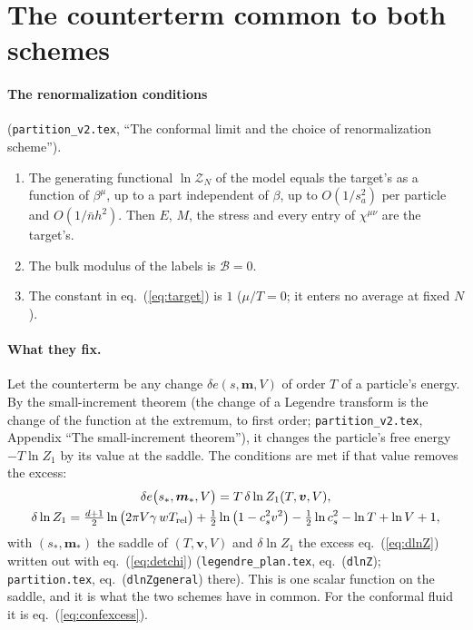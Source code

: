 \documentclass[11pt,aps,preprint,nofootinbib,superscriptaddress,tightenlines]{revtex4-2}
\newcommand{\klab}{\mathcal B}
\def\st{\begin{equation}}
\def\stp{\end{equation}}
\def\Eq#1{eq.~(\ref{#1})}
\let\oldparagraph\paragraph
\renewcommand{\paragraph}{\par\bigskip\oldparagraph}
\begin{document}
\section{The counterterm common to both schemes}
\label{sec:common}

\paragraph{The renormalization conditions} (\nolinkurl{partition_v2.tex}, ``The conformal limit and the choice of renormalization scheme'').
\begin{enumerate}
\item The generating functional $\ln\mathcal Z_N$ of the model equals the target's as a function of $\beta^\mu$, up to a part independent of $\beta$,
  up to $O(1/s_a^2)$ per particle and $O(1/\bar nh^2)$.  Then $E$, $M$, the stress and every entry of $\chi^{\mu\nu}$ are the target's.
\item The bulk modulus of the labels is $\klab=0$.
\item The constant in \Eq{eq:target} is $1$ ($\mu/T=0$; it enters no average at fixed $N$).
\end{enumerate}

\paragraph{What they fix.}  Let the counterterm be any change $\delta e(s,\bm m,V)$ of order $T$ of a particle's energy.  By the small-increment theorem
(the change of a Legendre transform is the change of the function at the extremum, to first order; \nolinkurl{partition_v2.tex}, Appendix ``The
small-increment theorem''), it changes the particle's free energy $-T\ln Z_1$ by its value at the saddle.  The conditions are met if that value
removes the excess:
\st
\begin{gathered}
\delta e\big(s_*,\bm m_*,V\big)=T\,\delta\ln Z_1(T,\bm v,V),\\
\delta\ln Z_1=\tfrac{d+1}2\ln\big(2\pi V\gamma\,wT_{\rm rel}\big)+\tfrac12\ln\big(1-c_s^2v^2\big)-\tfrac12\ln c_s^2-\ln T+\ln V+1 ,
\end{gathered}
\label{eq:counterterm}
\stp
with $(s_*,\bm m_*)$ the saddle of $(T,\bm v,V)$ and $\delta\ln Z_1$ the excess \Eq{eq:dlnZ} written out with \Eq{eq:detchi}
(\nolinkurl{legendre_plan.tex}, eq.~(\texttt{dlnZ}); \nolinkurl{partition.tex}, eq.~(\texttt{dlnZgeneral}) there).  This is one scalar function on the saddle, and it is
what the two schemes have in common.  For the conformal fluid it is \Eq{eq:confexcess}.
\end{document}
